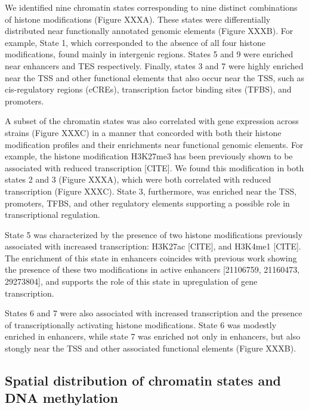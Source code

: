 \documentclass[10pt,letterpaper]{article}
\begin{document}
We identified nine chromatin states corresponding to nine distinct
combinations of histone modifications (Figure XXXA). These states were
differentially distributed near functionally annotated genomic elements
(Figure XXXB). For example, State 1, which corresponded to the absence
of all four histone modifications, found mainly in intergenic regions.
States 5 and 9 were enriched near enhancers and TES respectively.
Finally, states 3 and 7 were highly enriched near the TSS and other
functional elements that also occur near the TSS, such as cis-regulatory
regions (cCREs), transcription factor binding sites (TFBS), and
promoters.

A subset of the chromatin states was also correlated with gene
expression across strains (Figure XXXC) in a manner that concorded with
both their histone modification profiles and their enrichments near
functional genomic elements. For example, the histone modification
H3K27me3 has been previously shown to be associated with reduced
transcription {[}CITE{]}. We found this modification in both states 2
and 3 (Figure XXXA), which were both correlated with reduced
transcription (Figure XXXC). State 3, furthermore, was enriched near the
TSS, promoters, TFBS, and other regulatory elements supporting a
possible role in transcriptional regulation.

State 5 was characterized by the presence of two histone modifications
previously associated with increased transcription: H3K27ac {[}CITE{]},
and H3K4me1 {[}CITE{]}. The enrichment of this state in enhancers
coincides with previous work showing the presence of these two
modifications in active enhancers {[}21106759, 21160473, 29273804{]},
and supports the role of this state in upregulation of gene
transcription.

States 6 and 7 were also associated with increased transcription and the
presence of transcriptionally activating histone modifications. State 6
was modestly enriched in enhancers, while state 7 was enriched not only
in enhancers, but also stongly near the TSS and other associated
functional elements (Figure XXXB).

\hypertarget{spatial-distribution-of-chromatin-states-and-dna-methylation}{%
\subsection{Spatial distribution of chromatin states and DNA
methylation}\label{spatial-distribution-of-chromatin-states-and-dna-methylation}}
\end{document}
